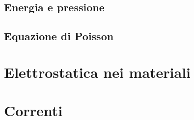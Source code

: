 \documentclass{article}
\numberwithin{equation}{section}
\begin{document}

\subsection{Energia e pressione} %
\label{sub:energia_e_pressione}


\subsection{Equazione di Poisson} %
\label{sub:equazione_di_poisson}



\section{Elettrostatica nei materiali} %
\label{sec:elettrostatica_nei_materiali}


\section{Correnti} %
\label{sec:correnti}

\end{document}

